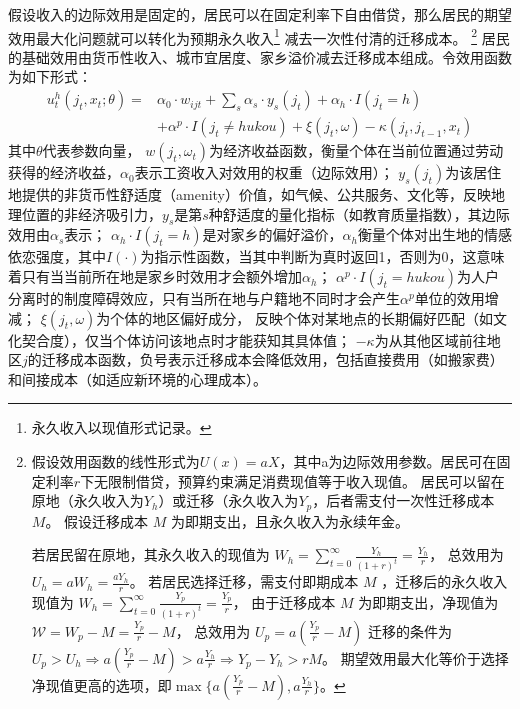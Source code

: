 \documentclass[a4paper,12pt,oneside, fontset=mac]{ctexbook} %
\begin{document}
假设收入的边际效用是固定的，居民可以在固定利率下自由借贷，那么居民的期望效用最大化问题就可以转化为预期永久收入\footnote{永久收入以现值形式记录。}
减去一次性付清的迁移成本。
\footnote{
假设效用函数的线性形式为$U(x)=a X$，其中a为边际效用参数。居民可在固定利率$r$下无限制借贷，预算约束满足消费现值等于收入现值。
居民可以留在原地（永久收入为$Y_h$）或迁移（永久收入为$Y_p$，后者需支付一次性迁移成本 $M$。
假设迁移成本 
$M$
为即期支出，且永久收入为永续年金。

若居民留在原地，其永久收入的现值为
$W_h = \sum\limits_{t=0}^\infty \frac{Y_h}{(1+r)^t}=\frac{Y_h}{r}$，
总效用为$U_h=a W_h = \frac{a Y_h}{r}$。
若居民选择迁移，需支付即期成本 
$M$
，迁移后的永久收入现值为
$W_h = \sum\limits_{t=0}^\infty \frac{Y_p}{(1+r)^t}=\frac{Y_p}{r}$，
由于迁移成本 
$M$
为即期支出，净现值为
$\mathcal{W}=W_p-M=\frac{Y_p}{r}-M$，
总效用为
$U_p=a(\frac{Y_p}{r}-M)$
迁移的条件为$U_p>U_h \Rightarrow a(\frac{Y_p}{r}-M) > a \frac{ Y_h}{r} \Rightarrow Y_p-Y_h > rM$。
期望效用最大化等价于选择净现值更高的选项，即$\max\{a(\frac{Y_p}{r}-M), a \frac{ Y_h}{r}\}$。
}
居民的基础效用由货币性收入、城市宜居度、家乡溢价减去迁移成本组成。令效用函数为如下形式：
\begin{equation}
  \begin{split}
    u_t^h(j_t,x_t;\theta)=&\alpha_0 \cdot w_{ijt}+\sum\limits_{s} \alpha_{s} \cdot y_{s}(j_t)  + \alpha_h \cdot I(j_t=h) 
    \\& + \alpha^p \cdot I(j_t \neq hukou) +\xi(j_t,\omega)-\kappa(j_t,j_{t-1},x_t)
  \end{split}
  \label{eq:家乡效用函数中的具体构成}
\end{equation}
其中$\theta$代表参数向量， $w(j_t,\omega_t)$为经济收益函数，衡量个体在当前位置通过劳动获得的经济收益，$\alpha_0$表示工资收入对效用的权重（边际效用）；
$y_{s}(j_t)$为该居住地提供的非货币性舒适度（amenity）价值，如气候、公共服务、文化等，反映地理位置的非经济吸引力，$y_s$是第$s$种舒适度的量化指标（如教育质量指数），其边际效用由$\alpha_s$表示；
$\alpha_h \cdot I(j_t=h)$是对家乡的偏好溢价，$\alpha_h$衡量个体对出生地的情感依恋强度，其中$I(\cdot)$为指示性函数，当其中判断为真时返回1，否则为0，这意味着只有当当前所在地是家乡时效用才会额外增加$\alpha_h$；
$\alpha^p \cdot I(j_t = hukou)$为人户分离时的制度障碍效应，只有当所在地与户籍地不同时才会产生$\alpha^p$单位的效用增减；
$\xi(j_t,\omega)$为个体的地区偏好成分，
反映个体对某地点的长期偏好匹配（如文化契合度），仅当个体访问该地点时才能获知其具体值；
$-\kappa$为从其他区域前往地区$j$的迁移成本函数，负号表示迁移成本会降低效用，包括直接费用（如搬家费）和间接成本（如适应新环境的心理成本）。
\end{document}
